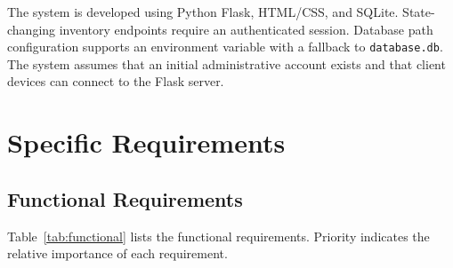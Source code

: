 \documentclass[conference]{IEEEtran}
\begin{document}
The system is developed using Python Flask, HTML/CSS, and SQLite. State-changing inventory endpoints require an authenticated session. Database path configuration supports an environment variable with a fallback to \texttt{database.db}. The system assumes that an initial administrative account exists and that client devices can connect to the Flask server.

\section{Specific Requirements}

\subsection{Functional Requirements}

Table~\ref{tab:functional} lists the functional requirements. Priority indicates the relative importance of each requirement.
\end{document}
